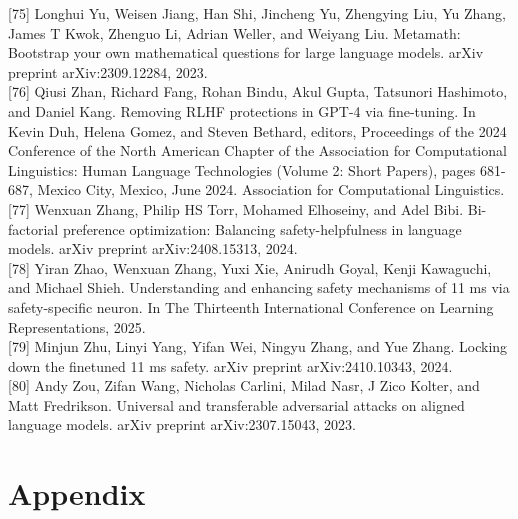 \documentclass[10pt]{article}
\begin{document}
[75] Longhui Yu, Weisen Jiang, Han Shi, Jincheng Yu, Zhengying Liu, Yu Zhang, James T Kwok, Zhenguo Li, Adrian Weller, and Weiyang Liu. Metamath: Bootstrap your own mathematical questions for large language models. arXiv preprint arXiv:2309.12284, 2023.\\[0pt]
[76] Qiusi Zhan, Richard Fang, Rohan Bindu, Akul Gupta, Tatsunori Hashimoto, and Daniel Kang. Removing RLHF protections in GPT-4 via fine-tuning. In Kevin Duh, Helena Gomez, and Steven Bethard, editors, Proceedings of the 2024 Conference of the North American Chapter of the Association for Computational Linguistics: Human Language Technologies (Volume 2: Short Papers), pages 681-687, Mexico City, Mexico, June 2024. Association for Computational Linguistics.\\[0pt]
[77] Wenxuan Zhang, Philip HS Torr, Mohamed Elhoseiny, and Adel Bibi. Bi-factorial preference optimization: Balancing safety-helpfulness in language models. arXiv preprint arXiv:2408.15313, 2024.\\[0pt]
[78] Yiran Zhao, Wenxuan Zhang, Yuxi Xie, Anirudh Goyal, Kenji Kawaguchi, and Michael Shieh. Understanding and enhancing safety mechanisms of 11 ms via safety-specific neuron. In The Thirteenth International Conference on Learning Representations, 2025.\\[0pt]
[79] Minjun Zhu, Linyi Yang, Yifan Wei, Ningyu Zhang, and Yue Zhang. Locking down the finetuned 11 ms safety. arXiv preprint arXiv:2410.10343, 2024.\\[0pt]
[80] Andy Zou, Zifan Wang, Nicholas Carlini, Milad Nasr, J Zico Kolter, and Matt Fredrikson. Universal and transferable adversarial attacks on aligned language models. arXiv preprint arXiv:2307.15043, 2023.

\section*{Appendix}
\end{document}
